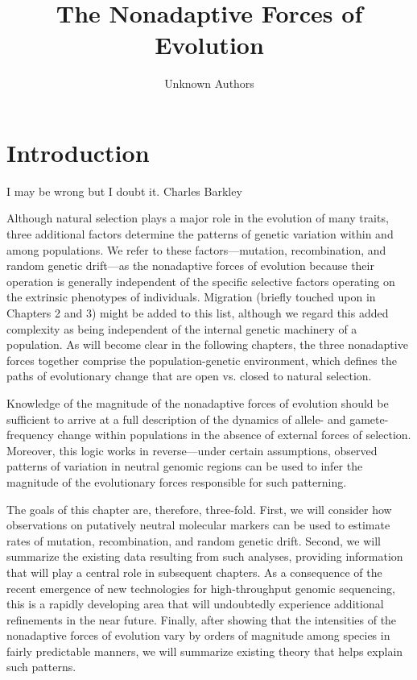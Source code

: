 \documentclass{article}
\title{The Nonadaptive Forces of Evolution}
\author{Unknown Authors}
\date{}
\begin{document}
\maketitle

\begin{abstract}

\end{abstract}

\section{Introduction}
I may be wrong but I doubt it. Charles Barkley

Although natural selection plays a major role in the evolution of many traits, three additional factors determine the patterns of genetic variation within and among populations. We refer to these factors—mutation, recombination, and random genetic drift—as the nonadaptive forces of evolution because their operation is generally independent of the specific selective factors operating on the extrinsic phenotypes of individuals. Migration (briefly touched upon in Chapters 2 and 3) might be added to this list, although we regard this added complexity as being independent of the internal genetic machinery of a population. As will become clear in the following chapters, the three nonadaptive forces together comprise the population-genetic environment, which defines the paths of evolutionary change that are open vs. closed to natural selection.

Knowledge of the magnitude of the nonadaptive forces of evolution should be sufficient to arrive at a full description of the dynamics of allele- and gamete-frequency change within populations in the absence of external forces of selection. Moreover, this logic works in reverse—under certain assumptions, observed patterns of variation in neutral genomic regions can be used to infer the magnitude of the evolutionary forces responsible for such patterning.

The goals of this chapter are, therefore, three-fold. First, we will consider how observations on putatively neutral molecular markers can be used to estimate rates of mutation, recombination, and random genetic drift. Second, we will summarize the existing data resulting from such analyses, providing information that will play a central role in subsequent chapters. As a consequence of the recent emergence of new technologies for high-throughput genomic sequencing, this is a rapidly developing area that will undoubtedly experience additional refinements in the near future. Finally, after showing that the intensities of the nonadaptive forces of evolution vary by orders of magnitude among species in fairly predictable manners, we will summarize existing theory that helps explain such patterns.
\end{document}
